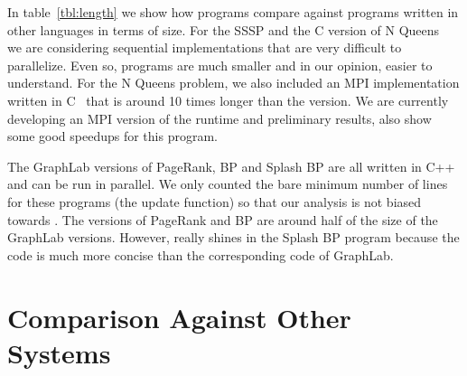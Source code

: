In table~\ref{tbl:length} we show how \lang programs compare against programs written in other languages in
terms of size. For the SSSP and the C version of N Queens~\cite{8queens-parallel} we are considering sequential implementations
that are very difficult to parallelize. Even so, \lang programs are much smaller and in our opinion, easier
to understand. For the N Queens problem, we also included an MPI implementation written in C~\cite{Rolfe:2008:SMA:1473195.1473217}
that is around 10 times longer than the \lang version. We are currently developing an MPI version
of the \lang runtime and preliminary results, also show some good speedups for this program.

\begin{table}[ht]
\begin{center}
\end{center}
     \caption{Comparison of source code size against other languages.}
     \label{tbl:length}
\end{table}

The GraphLab versions of PageRank, BP and Splash BP are all written in C++ and can be run in
parallel. We only counted the bare minimum number of lines for these programs (the update function)
so that our analysis is not biased towards \lang. The \lang versions of PageRank and BP are around
half of the size of the GraphLab versions. However, \lang really shines in the Splash BP program because
the code is much more concise than the corresponding code of GraphLab.

\section{Comparison Against Other Systems}

